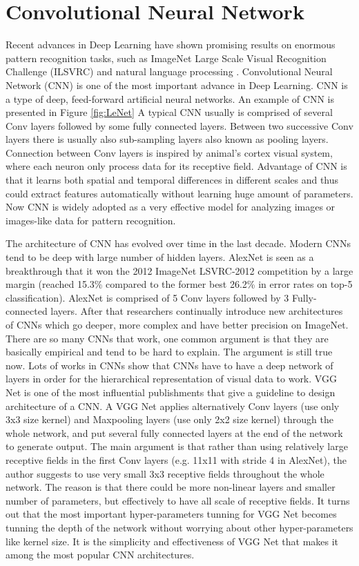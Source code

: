 \section{Convolutional Neural Network}
Recent advances in Deep Learning have shown promising results on enormous pattern recognition tasks, such as ImageNet Large Scale Visual Recognition Challenge (ILSVRC) \cite{russakovsky2015imagenet} \cite{krizhevsky2012imagenet}  \cite{szegedy2015going} and natural language processing \cite{goldberg2014word2vec} \cite{sutskever2014sequence}. Convolutional Neural Network (CNN) is one of the most important advance in Deep Learning. CNN is a type of deep, feed-forward artificial neural networks. An example of CNN is presented in Figure \ref{fig:LeNet} A typical CNN usually is comprised of several Conv layers followed by some fully connected layers. Between two successive Conv layers there is usually also sub-sampling layers also known as pooling layers. Connection between Conv layers is inspired by animal's cortex visual system, where each neuron only process data for its receptive field. Advantage of CNN is that it learns both spatial and temporal differences in different scales and thus could extract features automatically without learning huge amount of parameters. Now CNN is widely adopted as a very effective model for analyzing images or images-like data for pattern recognition.

The architecture of CNN has evolved over time in the last decade. Modern CNNs tend to be deep with large number of hidden layers. AlexNet is seen as a breakthrough that it won the 2012 ImageNet LSVRC-2012 competition by a large margin (reached 15.3\% compared to the former best 26.2\% in error rates on top-5 classification). AlexNet is comprised of 5 Conv layers followed by 3 Fully-connected layers. After that researchers continually introduce new architectures of CNNs which go deeper, more complex and have better precision on ImageNet. There are so many CNNs that work, one common argument is that they are basically empirical and tend to be hard to explain. The argument is still true now. Lots of works in CNNs show that CNNs have to have a deep network of layers in order for the hierarchical representation of visual data to work. VGG Net\cite{simonyan2014very} is one of the most influential publishments that give a guideline to design architecture of a CNN. A VGG Net applies alternatively Conv layers (use only 3x3 size kernel) and Maxpooling layers (use only 2x2 size kernel) through the whole network, and put several fully connected layers at the end of the network to generate output. The main argument is that rather than using relatively large receptive fields in the first Conv layers (e.g. 11x11 with stride 4 in AlexNet\cite{krizhevsky2012imagenet}), the author suggests to use very small 3x3 receptive fields throughout the whole network. The reason is that there could be more non-linear layers and smaller number of parameters, but effectively to have all scale of receptive fields. It turns out that the most important hyper-parameters tunning for VGG Net becomes tunning the depth of the network without worrying about other hyper-parameters like kernel size. It is the simplicity and effectiveness of VGG Net that makes it among the most popular CNN architectures. 


